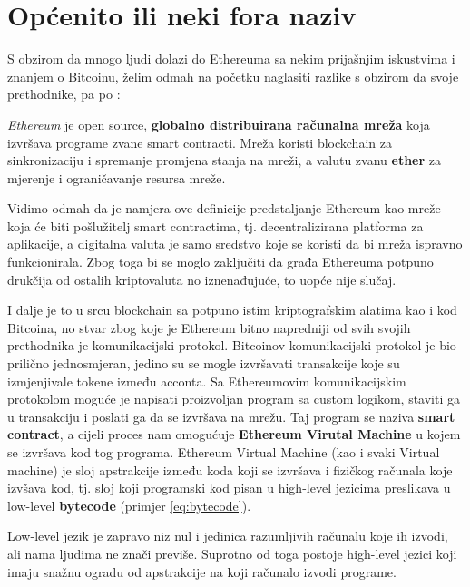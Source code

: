 \documentclass[12pt]{report}
\begin{document}
\section{Općenito ili neki fora naziv}

S obzirom da mnogo ljudi dolazi do Ethereuma sa nekim prijašnjim iskustvima i znanjem o Bitcoinu, želim odmah na početku naglasiti razlike s obzirom da svoje prethodnike, pa po \cite{ethbook}:

\begin{definicija}
\textit{Ethereum} je open source, \textbf{globalno distribuirana računalna mreža} koja izvršava programe zvane smart contracti. Mreža koristi blockchain za sinkronizaciju i spremanje promjena stanja na mreži, a valutu zvanu \textbf{ether} za mjerenje i ograničavanje resursa mreže.
\end{definicija}

Vidimo odmah da je namjera ove definicije predstaljanje Ethereum kao mreže koja će biti pošlužitelj smart contractima, tj. decentralizirana platforma za aplikacije, a digitalna valuta je samo sredstvo koje se koristi da bi mreža ispravno funkcionirala. Zbog toga bi se moglo zaključiti da građa Ethereuma potpuno drukčija od ostalih kriptovaluta no iznenađujuće, to uopće nije slučaj.

I dalje je to u srcu blockchain sa potpuno istim kriptografskim alatima kao i kod Bitcoina, no stvar zbog koje je Ethereum bitno napredniji od svih svojih prethodnika je komunikacijski protokol. Bitcoinov komunikacijski protokol je bio prilično jednosmjeran, jedino su se mogle izvršavati transakcije koje su izmjenjivale tokene između acconta. Sa Ethereumovim komunikacijskim protokolom moguće je napisati proizvoljan program sa custom logikom, staviti ga u transakciju i poslati ga da se izvršava na mrežu. Taj program se naziva \textbf{smart contract}, a cijeli proces nam omogućuje \textbf{Ethereum Virutal Machine} u kojem se izvršava kod tog programa. Ethereum Virtual Machine (kao i svaki Virtual machine) je sloj apstrakcije između koda koji se izvršava i fizičkog računala koje izvšava kod, tj. sloj koji programski kod pisan u high-level jezicima preslikava u low-level \textbf{bytecode} (primjer \ref{eq:bytecode}).

\begin{napomena}
Low-level jezik je zapravo niz nul i jedinica razumljivih računalu koje ih izvodi, ali nama ljudima ne znači previše. Suprotno od toga postoje high-level jezici koji imaju snažnu ogradu od apstrakcije na koji računalo izvodi programe.
\end{napomena}
\end{document}
